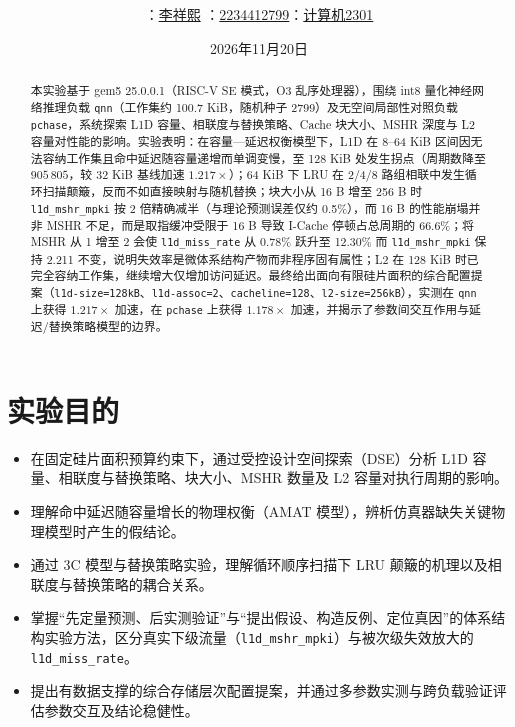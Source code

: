 \documentclass[12pt,a4paper,fontset=mac]{ctexart}
\title{\reporttitle\\[0.4em]\large\subtask}
\author{\small\authname：\underline{李祥熙}\quad
\authid：\underline{2234412799}\quad\class：\underline{计算机2301}}
\date{2026年11月20日}
\begin{document}
\maketitle

\begin{abstract}
本实验基于 gem5 25.0.0.1（RISC-V SE 模式，O3 乱序处理器），围绕 int8 量化神经网络推理负载 \texttt{qnn}（工作集约 100.7 KiB，随机种子 2799）及无空间局部性对照负载 \texttt{pchase}，系统探索 L1D 容量、相联度与替换策略、Cache 块大小、MSHR 深度与 L2 容量对性能的影响。实验表明：在容量—延迟权衡模型下，L1D 在 8--64 KiB 区间因无法容纳工作集且命中延迟随容量递增而单调变慢，至 128 KiB 处发生拐点（周期数降至 $905\,805$，较 32 KiB 基线加速 $1.217\times$）；64 KiB 下 LRU 在 2/4/8 路组相联中发生循环扫描颠簸，反而不如直接映射与随机替换；块大小从 16 B 增至 256 B 时 \texttt{l1d\_mshr\_mpki} 按 2 倍精确减半（与理论预测误差仅约 0.5\%），而 16 B 的性能崩塌并非 MSHR 不足，而是取指缓冲受限于 16 B 导致 I-Cache 停顿占总周期的 66.6\%；将 MSHR 从 1 增至 2 会使 \texttt{l1d\_miss\_rate} 从 0.78\% 跃升至 12.30\% 而 \texttt{l1d\_mshr\_mpki} 保持 2.211 不变，说明失效率是微体系结构产物而非程序固有属性；L2 在 128 KiB 时已完全容纳工作集，继续增大仅增加访问延迟。最终给出面向有限硅片面积的综合配置提案（\texttt{l1d-size=128kB}、\texttt{l1d-assoc=2}、\texttt{cacheline=128}、\texttt{l2-size=256kB}），实测在 \texttt{qnn} 上获得 $1.217\times$ 加速，在 \texttt{pchase} 上获得 $1.178\times$ 加速，并揭示了参数间交互作用与延迟/替换策略模型的边界。
\end{abstract}

\clearpage
\tableofcontents
\newpage

\section{实验目的}
\begin{itemize}
  \item 在固定硅片面积预算约束下，通过受控设计空间探索（DSE）分析 L1D 容量、相联度与替换策略、块大小、MSHR 数量及 L2 容量对执行周期的影响。
  \item 理解命中延迟随容量增长的物理权衡（AMAT 模型），辨析仿真器缺失关键物理模型时产生的假结论。
  \item 通过 3C 模型与替换策略实验，理解循环顺序扫描下 LRU 颠簸的机理以及相联度与替换策略的耦合关系。
  \item 掌握“先定量预测、后实测验证”与“提出假设、构造反例、定位真因”的体系结构实验方法，区分真实下级流量（\texttt{l1d\_mshr\_mpki}）与被次级失效放大的 \texttt{l1d\_miss\_rate}。
  \item 提出有数据支撑的综合存储层次配置提案，并通过多参数实测与跨负载验证评估参数交互及结论稳健性。
\end{itemize}
\end{document}
